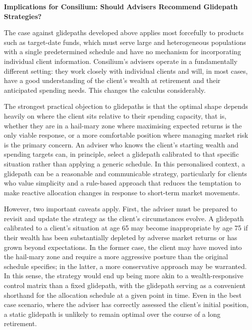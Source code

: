 \documentclass[11pt]{article}
\newcommand{\asideboxtitle}[1]{\noindent\textbf{\large #1}\par\vspace{0.5em}}
\begin{document}
\begin{asidebox}
\asideboxtitle{Implications for Consilium: Should Advisers Recommend Glidepath Strategies?}

The case against glidepaths developed above applies most forcefully to products such as target-date funds, which must serve large and heterogeneous populations with a single predetermined schedule and have no mechanism for incorporating individual client information. Consilium's advisers operate in a fundamentally different setting: they work closely with individual clients and will, in most cases, have a good understanding of the client's wealth at retirement and their anticipated spending needs. This changes the calculus considerably.

The strongest practical objection to glidepaths is that the optimal shape depends heavily on where the client sits relative to their spending capacity, that is, whether they are in a hail-mary zone where maximising expected returns is the only viable response, or a more comfortable position where managing market risk is the primary concern. An adviser who knows the client's starting wealth and spending targets can, in principle, select a glidepath calibrated to that specific situation rather than applying a generic schedule. In this personalised context, a glidepath can be a reasonable and communicable strategy, particularly for clients who value simplicity and a rule-based approach that reduces the temptation to make reactive allocation changes in response to short-term market movements.

However, two important caveats apply. First, the adviser must be prepared to revisit and update the strategy as the client's circumstances evolve. A glidepath calibrated to a client's situation at age 65 may become inappropriate by age 75 if their wealth has been substantially depleted by adverse market returns or has grown beyond expectations. In the former case, the client may have moved into the hail-mary zone and require a more aggressive posture than the original schedule specifies; in the latter, a more conservative approach may be warranted. In this sense, the strategy would end up being more akin to a wealth-responsive control matrix than a fixed glidepath, with the glidepath serving as a convenient shorthand for the allocation schedule at a given point in time. Even in the best case scenario, where the adviser has correctly assessed the client's initial position, a static glidepath is unlikely to remain optimal over the course of a long retirement.


\end{asidebox}
\end{document}
